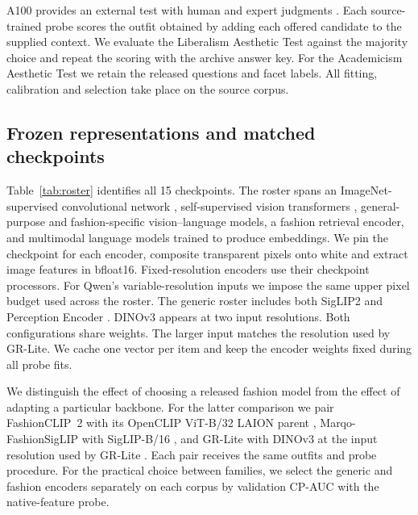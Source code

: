 \documentclass[preprint,12pt]{elsarticle}
\begin{document}
A100 provides an external test with human and expert judgments \cite{zou2022a100}.
Each source-trained probe scores the outfit obtained by adding each offered candidate
to the supplied context. We evaluate the Liberalism Aesthetic Test against the majority
choice and repeat the scoring with the archive answer key. For the Academicism
Aesthetic Test we retain the released questions and facet labels. All fitting,
calibration and selection take place on the source corpus.


\subsection{Frozen representations and matched checkpoints}

Table~\ref{tab:roster} identifies all 15 checkpoints. The roster spans an ImageNet-supervised convolutional network \cite{he2016resnet}, self-supervised vision
transformers \cite{simeoni2025dinov3}, general-purpose and fashion-specific vision--language models, a fashion
retrieval encoder, and multimodal language models trained to produce embeddings.
We pin the checkpoint for each encoder, composite transparent pixels onto white and
extract image features in bfloat16. Fixed-resolution encoders use their checkpoint
processors. For Qwen's variable-resolution inputs we impose the same upper pixel
budget used across the roster. The generic roster includes both SigLIP2 and Perception Encoder \cite{tschannen2025siglip2,bolya2025pe}. DINOv3 appears at two input resolutions. Both configurations share weights. The larger input matches the resolution used by GR-Lite. We cache one vector per item and keep the encoder
weights fixed during all probe fits.

We distinguish the effect of choosing a released fashion model from the effect of
adapting a particular backbone. For the latter comparison we pair FashionCLIP~2
with its OpenCLIP ViT-B/32 LAION parent \cite{cherti,laion}, Marqo-FashionSigLIP with SigLIP-B/16 \cite{marqocard,marqoclip},
and GR-Lite with DINOv3 at the input resolution used by GR-Lite \cite{gao2026lookbench,grlitecard}. Each pair receives
the same outfits and probe procedure. For the practical choice between families,
we select the generic and fashion encoders separately on each corpus by validation
CP-AUC with the native-feature probe.
\end{document}
